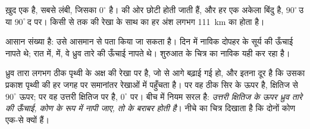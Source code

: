  ख़ुद एक  है, सबसे लंबी, जिसका  $0^\circ$ है।
  की ओर छोटी होती जाती हैं, और हर  एक अकेला बिंदु है,
$90^\circ$\,उ या $90^\circ$\,द पर। किसी  से  तक की रेखा के साथ
 का हर अंश लगभग \qty{111}{km} का होता है।

 आसान संख्या है: उसे आसमान से पता किया जा सकता है। दिन में नाविक दोपहर के
सूर्य की ऊँचाई नापते थे; रात में,  में, वे ध्रुव तारे की ऊँचाई नापते थे।
शुरुआत के चित्र का नाविक यही
कर रहा है।

ध्रुव तारा लगभग ठीक पृथ्वी के अक्ष की रेखा पर है, जो  से आगे बढ़ाई गई
हो, और इतना दूर है कि उसका प्रकाश पृथ्वी की हर जगह पर समानांतर रेखाओं में पहुँचता है।
 पर वह ठीक सिर के ऊपर है, क्षितिज से $90^\circ$ ऊपर;  पर वह
उत्तरी क्षितिज पर है, $0^\circ$ पर। बीच में नियम सरल है:
\emph{उत्तरी क्षितिज के ऊपर ध्रुव तारे की ऊँचाई, कोण के रूप में नापी जाए, तो
 के बराबर होती है}। नीचे का चित्र दिखाता है कि दोनों कोण एक-से क्यों
हैं।

